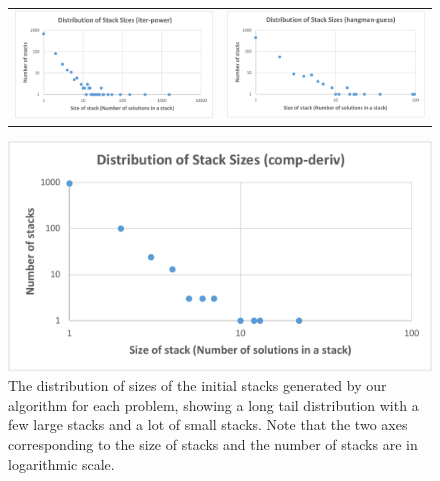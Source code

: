 \begin{figure}
\centering
\begin{tabular}{c c}
\includegraphics[scale=0.30]{Body/figures/overcode/stacksdistr-iter-power}
&
\includegraphics[scale=0.405]{Body/figures/overcode/stacksdistr-hangman}
\end{tabular}
\includegraphics[scale=0.38]{Body/figures/overcode/stacksdistr-comp-deriv}
\caption{The distribution of sizes of the initial stacks generated by our algorithm for each problem, showing a long tail distribution with a few large stacks and a lot of small stacks. Note that the two axes corresponding to the size of stacks and the number of stacks are in logarithmic scale.}
\label{stackdistribution}
\end{figure}

